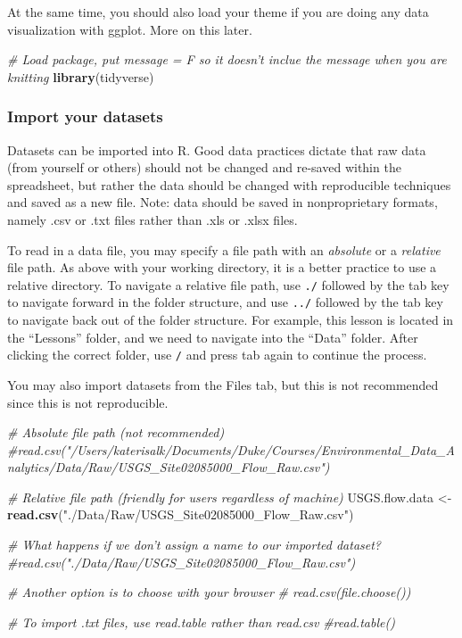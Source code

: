\documentclass[]{article}
\newenvironment{Shaded}{\begin{snugshade}}{\end{snugshade}}
\newcommand{\CommentTok}[1]{\textcolor[rgb]{0.56,0.35,0.01}{\textit{#1}}}
\newcommand{\KeywordTok}[1]{\textcolor[rgb]{0.13,0.29,0.53}{\textbf{#1}}}
\newcommand{\NormalTok}[1]{#1}
\newcommand{\StringTok}[1]{\textcolor[rgb]{0.31,0.60,0.02}{#1}}
\begin{document}
At the same time, you should also load your theme if you are doing any
data visualization with ggplot. More on this later.

\begin{Shaded}
\begin{Highlighting}[]
\CommentTok{# Load package, put message = F so it doesn't inclue the message when you are knitting}
\KeywordTok{library}\NormalTok{(tidyverse)}
\end{Highlighting}
\end{Shaded}

\hypertarget{import-your-datasets}{%
\subsubsection{Import your datasets}\label{import-your-datasets}}

Datasets can be imported into R. Good data practices dictate that raw
data (from yourself or others) should not be changed and re-saved within
the spreadsheet, but rather the data should be changed with reproducible
techniques and saved as a new file. Note: data should be saved in
nonproprietary formats, namely .csv or .txt files rather than .xls or
.xlsx files.

To read in a data file, you may specify a file path with an
\emph{absolute} or a \emph{relative} file path. As above with your
working directory, it is a better practice to use a relative directory.
To navigate a relative file path, use \texttt{./} followed by the tab
key to navigate forward in the folder structure, and use \texttt{../}
followed by the tab key to navigate back out of the folder structure.
For example, this lesson is located in the ``Lessons'' folder, and we
need to navigate into the ``Data'' folder. After clicking the correct
folder, use \texttt{/} and press tab again to continue the process.

You may also import datasets from the Files tab, but this is not
recommended since this is not reproducible.

\begin{Shaded}
\begin{Highlighting}[]
\CommentTok{# Absolute file path (not recommended)}
\CommentTok{#read.csv("/Users/katerisalk/Documents/Duke/Courses/Environmental_Data_Analytics/Data/Raw/USGS_Site02085000_Flow_Raw.csv")}

\CommentTok{# Relative file path (friendly for users regardless of machine)}
\NormalTok{USGS.flow.data <-}\StringTok{ }\KeywordTok{read.csv}\NormalTok{(}\StringTok{"./Data/Raw/USGS_Site02085000_Flow_Raw.csv"}\NormalTok{)}

\CommentTok{# What happens if we don't assign a name to our imported dataset?}
\CommentTok{#read.csv("./Data/Raw/USGS_Site02085000_Flow_Raw.csv")}

\CommentTok{# Another option is to choose with your browser}
\CommentTok{# read.csv(file.choose())}

\CommentTok{# To import .txt files, use read.table rather than read.csv}
\CommentTok{#read.table()}
\end{Highlighting}
\end{Shaded}
\end{document}
